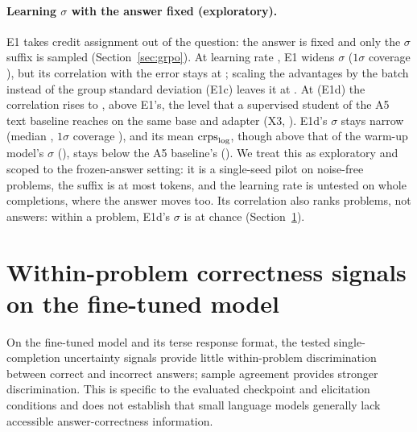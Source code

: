 \paragraph{Learning $\sigma$ with the answer fixed (exploratory).}
E1 takes credit assignment out of the question: the answer is fixed and only the $\sigma$ suffix is sampled
(Section~\ref{sec:grpo}).
At learning rate , E1 widens $\sigma$ ($1\sigma$ coverage ), but its correlation with the
error stays at ; scaling the advantages by the batch instead of the group standard deviation (E1c)
leaves it at .
At  (E1d) the correlation rises to ,  above E1's, the level that a
supervised student of the A5 text baseline reaches on the same base and adapter (X3, ).
E1d's $\sigma$ stays narrow (median , $1\sigma$ coverage ), and its mean
$\mathrm{crps}_{\log}$, though above that of the warm-up model's $\sigma$ (), stays below the A5 baseline's
().
We treat this as exploratory and scoped to the frozen-answer setting: it is a single-seed pilot on noise-free
problems, the suffix is at most  tokens, and the learning rate is untested on whole completions, where
the answer moves too.
Its correlation also ranks problems, not answers: within a problem, E1d's $\sigma$ is at chance
(Section~\ref{sec:act2}).

\section{Within-problem correctness signals on the fine-tuned model}
\label{sec:act2}
On the fine-tuned  model and its terse response format, the tested single-completion uncertainty
signals provide little within-problem discrimination between correct and incorrect answers; sample agreement provides
stronger discrimination.
This is specific to the evaluated checkpoint and elicitation conditions and does not establish that small language
models generally lack accessible answer-correctness information.


